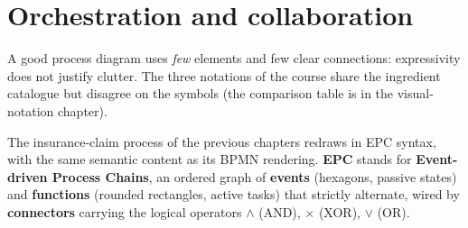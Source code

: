 \newpage
\section{Orchestration and collaboration}

A good process diagram uses \emph{few} elements and few clear connections: expressivity does not justify clutter. The three notations of the course share the ingredient catalogue but disagree on the symbols (the comparison table is in the visual-notation chapter).

The insurance-claim process of the previous chapters redraws in EPC syntax, with the same semantic content as its BPMN rendering. \textbf{EPC} stands for \textbf{Event-driven Process Chains}, an ordered graph of \textbf{events} (hexagons, passive states) and \textbf{functions} (rounded rectangles, active tasks) that strictly alternate, wired by \textbf{connectors} carrying the logical operators $\wedge$ (AND), $\times$ (XOR), $\vee$ (OR).

